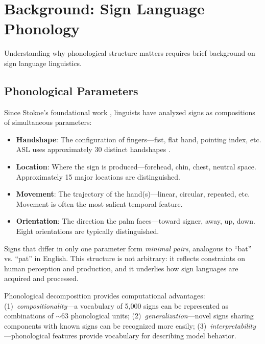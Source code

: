 \documentclass{article}
\theoremstyle{definition}
\theoremstyle{remark}
\begin{document}
\section{Background: Sign Language Phonology}
\label{sec:background}

Understanding why phonological structure matters requires brief background on sign language linguistics.

\subsection{Phonological Parameters}

Since Stokoe's foundational work \citep{stokoe1960sign}, linguists have analyzed signs as compositions of simultaneous parameters:

\begin{itemize}[nosep,topsep=2pt]
\item \textbf{Handshape}: The configuration of fingers---fist, flat hand, pointing index, etc. ASL uses approximately 30 distinct handshapes \citep{battison1978lexical}.
\item \textbf{Location}: Where the sign is produced---forehead, chin, chest, neutral space. Approximately 15 major locations are distinguished.
\item \textbf{Movement}: The trajectory of the hand(s)---linear, circular, repeated, etc. Movement is often the most salient temporal feature.
\item \textbf{Orientation}: The direction the palm faces---toward signer, away, up, down. Eight orientations are typically distinguished.
\end{itemize}%

Signs that differ in only one parameter form \textit{minimal pairs}, analogous to ``bat'' vs. ``pat'' in English. This structure is not arbitrary: it reflects constraints on human perception and production, and it underlies how sign languages are acquired and processed.

Phonological decomposition provides computational advantages: (1)~\textit{compositionality}---a vocabulary of 5,000 signs can be represented as combinations of $\sim$63 phonological units; (2)~\textit{generalization}---novel signs sharing components with known signs can be recognized more easily; (3)~\textit{interpretability}---phonological features provide vocabulary for describing model behavior.
\end{document}
